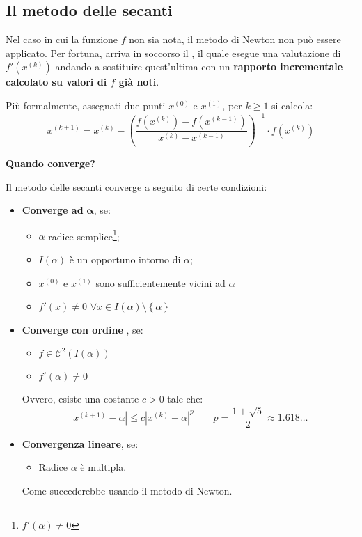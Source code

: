 \subsection{Il metodo delle secanti}

Nel caso in cui la funzione $f$ non sia nota, il metodo di Newton non può essere applicato. Per fortuna, arriva in soccorso il , il quale esegue una valutazione di $f'\left(x^{(k)}\right)$ andando a sostituire quest'ultima con un \textbf{rapporto incrementale calcolato su valori di $f$ già noti}.

\highspace
Più formalmente, assegnati due punti $x^{(0)}$ e $x^{(1)}$, per $k \ge 1$ si calcola:
\begin{equation}
    x^{(k+1)} = x^{(k)} - \left(\dfrac{f\left(x^{(k)}\right) - f\left(x^{(k-1)}\right)}{x^{(k)} - x^{(k-1)}}\right)^{-1} \cdot f\left(x^{(k)}\right)
\end{equation}

\begin{flushleft}
    \textcolor{Green3}{ \textbf{Quando converge?}}
\end{flushleft}
Il metodo delle secanti converge a seguito di certe condizioni:
\begin{itemize}
    \item \textbf{Converge ad} $\bm{\alpha}$, se:
    \begin{itemize}
        \item $\alpha$ radice semplice\footnote{$f'\left(\alpha\right) \ne 0$};
        \item $I\left(\alpha\right)$ è un opportuno intorno di $\alpha$;
        \item $x^{(0)}$ e $x^{(1)}$ sono sufficientemente vicini ad $\alpha$
        \item $f'\left(x\right) \ne 0$ $\forall x \in I\left(\alpha\right) \setminus \left\{\alpha\right\}$
    \end{itemize}

    \item \textbf{Converge con ordine} , se:
    \begin{itemize}
        \item $f \in \mathcal{C}^{2}\left(I\left(\alpha\right)\right)$
        \item $f'\left(\alpha\right) \ne 0$
    \end{itemize}
    Ovvero, esiste una costante $c > 0$ tale che:
    \begin{equation}
        \left| x^{\left(k+1\right)} - \alpha\right| \le c\left| x^{(k)} - \alpha \right|^{p} \hspace{2em} p = \dfrac{1 + \sqrt{5}}{2} \approx 1.618\dots
    \end{equation}

    \item \textbf{Convergenza lineare}, se:
    \begin{itemize}
        \item Radice $\alpha$ è multipla.
    \end{itemize}
    Come succederebbe usando il metodo di Newton.
\end{itemize}

